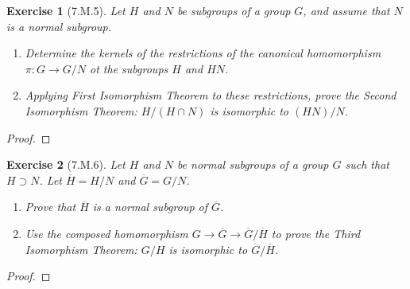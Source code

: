 \documentclass[12pt]{article}
\newtheorem*{exer}{Exercise}
\begin{document}
\begin{exer}[7.M.5]

    Let $H$ and $N$ be subgroups of a group $G$, and assume that $N$ is
    a normal subgroup.

    \begin{enumerate}
        \item Determine the kernels of the restrictions of the canonical
            homomorphism $\pi : G \rightarrow G/N$ ot the subgroups $H$
            and $HN$. 

        \item Applying First Isomorphism Theorem to these restrictions,
            prove the \textit{Second Isomorphism Theorem}: $H/(H \cap
            N)$ is isomorphic to $(HN)/N$. 
    \end{enumerate}

\end{exer}

\begin{proof}

\end{proof}


\begin{exer}[7.M.6]

    Let $H$ and $N$ be normal subgroups of a group $G$ such that $H
    \supset N$. Let $\overline{H} = H/N$ and $\overline{G} = G/N$.

    \begin{enumerate}
        \item Prove that $\overline{H}$ is a normal subgroup of
            $\overline{G}$. 
        \item Use the composed homomorphism $G \rightarrow \overline{G}
            \rightarrow \overline{G}/\overline{H}$ to prove the
            \textit{Third Isomorphism Theorem}: $G/H$ is isomorphic to
            $\overline{G} / \overline{H}$.
            
    \end{enumerate}

\end{exer}

\begin{proof}

\end{proof}
\end{document}
